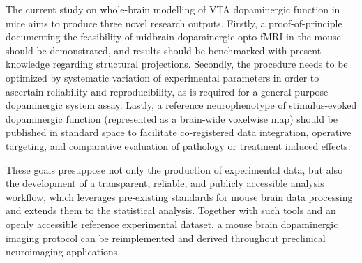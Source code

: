 The current study on whole-brain modelling of VTA dopaminergic function in mice aims to produce three novel research outputs.
Firstly, a proof-of-principle documenting the feasibility of midbrain dopaminergic opto-fMRI in the mouse should be demonstrated, and results should be benchmarked with present knowledge regarding structural projections.
Secondly, the procedure needs to be optimized by systematic variation of experimental parameters in order to ascertain reliability and reproducibility, as is required for a general-purpose dopaminergic system assay.
Lastly, a reference neurophenotype of stimulus-evoked dopaminergic function (represented as a brain-wide voxelwise map) should be published in standard space to facilitate co-registered data integration, operative targeting, and comparative evaluation of pathology or treatment induced effects.

These goals presuppose not only the production of experimental data, but also the development of a transparent, reliable, and publicly accessible analysis workflow, which leverages pre-existing standards for mouse brain data processing \cite{irsabi} and extends them to the statistical analysis.
Together with such tools and an openly accessible reference experimental dataset, a mouse brain dopaminergic imaging protocol can be reimplemented and derived throughout preclinical neuroimaging applications.
